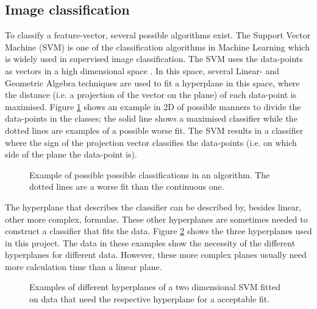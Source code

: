 \subsection{Image classification}
\label{sec:Theory-class}
To classify a feature-vector, several possible algorithms exist.
The Support Vector Machine (SVM) is one of the classification algorithms in Machine Learning which is widely used in supervised image classification.
The SVM uses the data-points as vectors in a high dimensional space \citep{boser1992training}.
In this space, several Linear- and Geometric Algebra techniques are used to fit a hyperplane in this space, where the distance (i.e. a projection of the vector on the plane) of each data-point is maximised.
Figure \ref{fig:svm-fits} shows an example in 2D of possible manners to divide the data-points in the classes; the solid line shows a maximised classifier while the dotted lines are examples of a possible worse fit.
The SVM results in a classifier where the sign of the projection vector classifies the data-points (i.e. on which side of the plane the data-point is).

\begin{figure}%
\centering
\ifx\showfig\undefined
 \fi
\captionsetup{width=.7\textwidth}
\caption{Example of possible possible classifications in an algorithm. The dotted lines are a worse fit than the continuous one.}
\label{fig:svm-fits}
\end{figure}

The hyperplane that describes the classifier can be described by, besides linear, other more complex, formulae.
These other hyperplanes are sometimes needed to construct a classifier that fits the data. Figure \ref{fig:svm-planes} shows the three hyperplanes used in this project.
The data in these examples show the necessity of the different hyperplanes for different data.
However, these more complex planes usually need more calculation time than a linear plane.

\begin{figure}%
\centering
\ifx\showfig\undefined
 \fi
\caption{Examples of different hyperplanes of a two dimensional SVM fitted on data that need the respective hyperplane for a acceptable fit.}
\label{fig:svm-planes}
\end{figure}
